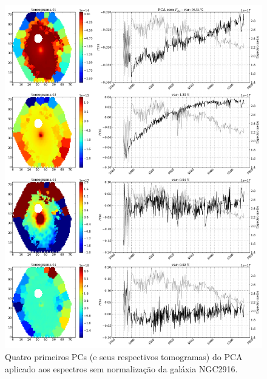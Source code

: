\begin{figure}
    \includegraphics[width=1.\textwidth]{figuras/K0277-tomo1a4.pdf}
    \caption[Tomogramas de 1 a 4 da gal\'axia NGC2916 - sem normaliza\c{c}\~ao.]
    {Quatro primeiros PCs (e seus respectivos tomogramas) do PCA aplicado aos espectros sem normalização da galáxia
    NGC2916.}
    \label{fig:UsoPCA:K277tomofobs}
\end{figure}
